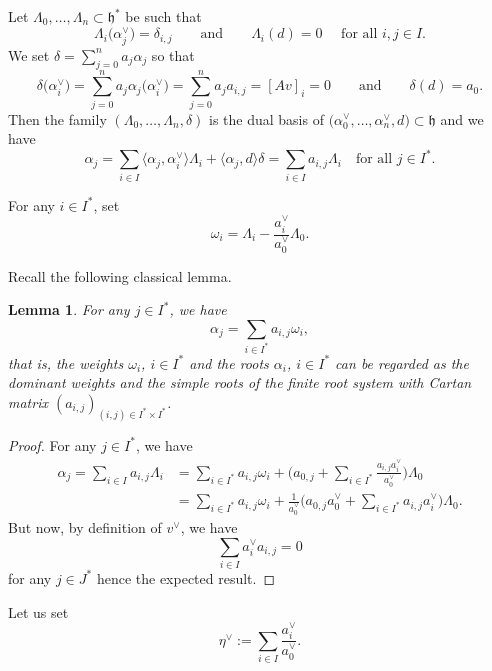 \documentclass[10pt,a4paper]{amsart}
\newtheorem{Lemma}[Theorem]{Lemma}
\numberwithin{equation}{section}
\newcommand{\al}{\alpha}
\newcommand{\La}{\Lambda}
\newcommand{\fh}{\mathfrak{h}}
\newcommand{\scal}[2]{\langle #1,#2\rangle}
\begin{document}
Let $\La_0,\dots,\La_{n}\subset \fh^\ast$ be such that
\[
\La_i\bigl(\al^\vee_j\bigr) = \delta_{i,j} \qquad\text{and}\qquad \La_i(d) = 0\quad \text{ for all $i,j\in I$.}
\]
We set $\delta = \sum_{j=0}^{n} a_j \al_j$ so that
\[
\delta\bigl(\al_i^\vee\bigr) = \sum_{j=0}^n a_j \al_j\bigl(\al_i^\vee\bigr)=\sum_{j=0}^n a_j a_{i,j} = [Av]_{i} =0\qquad \text{and} \qquad \delta(d) = a_0.
\]
Then the family $(\La_0,\dots,\La_n,\delta)$ is the dual basis of $\bigl(\al^\vee_0,\dots,\al^\vee_n,d\bigr)\subset \fh$ and we have
\[
\al_j = \sum_{i\in I} \bigl\langle\al_j,\al_i^\vee\bigr\rangle \La_i + \scal{\al_j}{d}\delta = \sum_{i\in I} a_{i,j} \La_i \quad \text{for all $j\in I^\ast$.}
\]

\smallskip

For any $i\in I^{\ast}$, set%
\[
\omega_{i}=\Lambda_{i}-\frac{a_{i}^{\vee}}{a_{0}^{\vee}}\Lambda_{0}.
\]

Recall the following classical lemma.

\begin{Lemma}
	For any $j\in I^{\ast}$, we have
	\[
	\alpha_{j}=\sum_{i\in I^{\ast}}a_{i,j}\omega_{i},%
	\]
	that is, the weights $\omega_{i}$, $i\in I^{\ast}$ and the roots $\alpha_{i}$, $i\in
	I^{\ast}$ can be regarded as the dominant weights and the simple roots of the
	finite root system with Cartan matrix $(a_{i,j})_{(i,j)\in I^{\ast}\times
		I^{\ast}}$.
\end{Lemma}

\begin{proof}
For any $j\in I^{\ast}$, we have%
\begin{align*}
\alpha_{j}=\sum_{i\in I}a_{i,j}\Lambda_{i}&{}=\sum_{i\in I^{\ast}}a_{i,j}%
\omega_{i}+\Biggl( a_{0,j}+\sum_{i\in I^{\ast}}\frac{a_{i,j}a_{i}^{\vee}%
}{a_{0}^{\vee}}\Biggr) \Lambda_{0}\\
&{}=
\sum_{i\in I^{\ast}}a_{i,j}\omega_{i}+\frac{1}{a_{0}^{\vee}}\Biggl(
a_{0,j}a_{0}^{\vee}+\sum_{i\in I^{\ast}}a_{i,j}a_{i}^{\vee}\Biggr)
\Lambda_{0}.
\end{align*}
But now, by definition of $v^{\vee}$, we have%
\[
\sum_{i\in I}a_{i}^{\vee}a_{i,j}=0
\]
for any $j\in J^{\ast}$ hence the expected result.
\end{proof}

Let us set%
\[
\eta^{\vee}:=\sum_{i\in I}\frac{a_{i}^{\vee}}{a_{0}^{\vee}}.
\]
\end{document}
